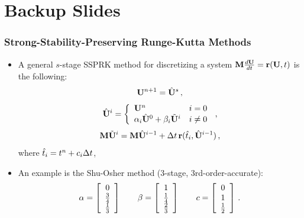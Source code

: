 \documentclass{beamer} \useoutertheme{infolines}
\begin{document}
\section{Backup Slides}
\begin{frame}
\frametitle{Strong-Stability-Preserving Runge-Kutta Methods}

\begin{itemize}
  \item A general $s$-stage SSPRK method for discretizing a system
    $\mathbf{M}\frac{d\mathbf{U}}{dt} = \mathbf{r}(\mathbf{U},t)$
    is the following:
    \begin{equation}
      \mathbf{U}^{n+1} = \hat{\mathbf{U}}^{s} \,,
    \end{equation}
    \begin{equation}
      \hat{\mathbf{U}}^i = \left\{\begin{array}{l l}
        \mathbf{U}^n & i = 0\\
        \alpha_i\hat{\mathbf{U}}^0
        + \beta_i\tilde{\mathbf{U}}^i & i\ne 0
      \end{array}\right. \,, 
    \end{equation}
    \begin{equation}
      \mathbf{M}\tilde{\mathbf{U}}^i = \mathbf{M}\hat{\mathbf{U}}^{i-1}
        + \Delta t\,\mathbf{r}(\hat{t}_i,\hat{\mathbf{U}}^{i-1})
      \,,
    \end{equation}
    where $\hat{t}_i = t^n+c_i\Delta t$,
  \item An example is the Shu-Osher method (3-stage, 3rd-order-accurate):
    \begin{equation}
      \alpha = \left[\begin{array}{c}
        0\\\frac{3}{4}\\\frac{1}{3}\end{array}\right]
        \qquad\beta = \left[\begin{array}{c}
        1\\\frac{1}{4}\\\frac{2}{3}\end{array}\right]
        \qquad c = \left[\begin{array}{c}0\\1\\\frac{1}{2}\end{array}\right] \,.
    \end{equation}
\end{itemize}

\end{frame}
\end{document}
